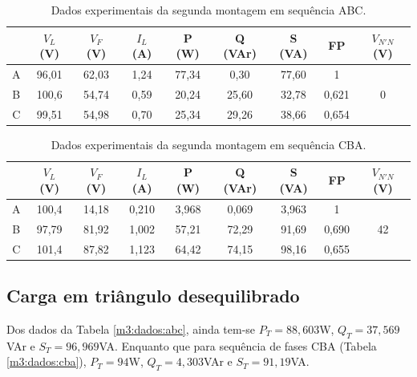 \documentclass[a4paper,12pt,oneside,openany,table,xcdraw]{article}
\begin{document}
\begin{table}[H]
\centering \small {}
\caption{Dados experimentais da segunda montagem em sequência ABC.}
\label{m2:dados:abc}
\begin{tabular}{c|c|c|c|c|c|c|c|c|}
\cline{2-9}
                        & $V_L$ (V) & $V_F$ (V) & $I_L$ (A) & P (W) & Q (VAr) & S (VA) & FP    & $V_{N'N}$ (V)      \\ \hline
\multicolumn{1}{|c|}{A} & 96,01     & 62,03     & 1,24      & 77,34 & 0,30    & 77,60  & 1     & \multirow{3}{*}{0} \\ \cline{1-8}
\multicolumn{1}{|c|}{B} & 100,6     & 54,74     & 0,59      & 20,24 & 25,60   & 32,78  & 0,621 &                    \\ \cline{1-8}
\multicolumn{1}{|c|}{C} & 99,51     & 54,98     & 0,70      & 25,34 & 29,26   & 38,66  & 0,654 &                    \\ \hline
\end{tabular}
\end{table}

\begin{table}[H]
\caption{Dados experimentais da segunda montagem em sequência CBA.}
\label{m2:dados:cba}
\centering \small {}
\begin{tabular}{c|c|c|c|c|c|c|c|c|}
\cline{2-9}
                        & $V_L$ (V) & $V_F$ (V) & $I_L$ (A) & P (W) & Q (VAr) & S (VA) & FP    & $V_{N'N}$ (V)      \\ \hline
\multicolumn{1}{|c|}{A} & 100,4     & 14,18     & 0,210     & 3,968 & 0,069   & 3,963  & 1     & \multirow{3}{*}{42} \\ \cline{1-8}
\multicolumn{1}{|c|}{B} & 97,79     & 81,92     & 1,002     & 57,21 & 72,29   & 91,69  & 0,690 &                     \\ \cline{1-8}
\multicolumn{1}{|c|}{C} & 101,4     & 87,82     & 1,123     & 64,42 & 74,15   & 98,16  & 0,655 &                     \\ \hline
\end{tabular}
\end{table}

\subsection{Carga em triângulo desequilibrado} \label{m3:dados}
Dos dados da Tabela \ref{m3:dados:abc}, ainda tem-se $P_T = 88,603$W, $Q_T = 37,569$VAr e $S_T = 96,969$VA. Enquanto que para sequência de fases CBA (Tabela \ref{m3:dados:cba}), $P_T = 94$W, $Q_T = 4,303$VAr e $S_T = 91,19$VA.
\end{document}
